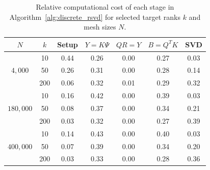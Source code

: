\begin{table}[ht]
\centering
    \begin{tabular}{cc ccccc}
    \toprule
    $N$ & $k$ & Setup & $Y=K\Psi$ & $QR=Y$ & $B=Q^T K$ & SVD \\
    \midrule
    \multirow{3}{*}{$4{,}000$}
    & 10  & 0.44 & 0.26 & 0.00 & 0.27 & 0.03 \\
    & 50  & 0.26 & 0.31 & 0.00 & 0.28 & 0.14 \\
    & 200 & 0.06 & 0.32 & 0.01 & 0.29 & 0.32 \\
    
    \midrule
    \multirow{3}{*}{$180{,}000$}
    & 10  & 0.16 & 0.42 & 0.00 & 0.39 & 0.03 \\
    & 50  & 0.08 & 0.37 & 0.00 & 0.34 & 0.21 \\
    & 200 & 0.03 & 0.32 & 0.00 & 0.27 & 0.39 \\

    \midrule
    \multirow{3}{*}{$400{,}000$}
    & 10  & 0.14 & 0.43 & 0.00 & 0.40 & 0.03 \\
    & 50  & 0.07 & 0.39 & 0.00 & 0.34 & 0.20 \\
    & 200 & 0.03 & 0.33 & 0.00 & 0.28 & 0.36 \\
    \bottomrule
    \end{tabular}
\caption{Relative computational cost of each stage in Algorithm~\ref{alg:discrete_rsvd} for selected target ranks $k$ and mesh sizes $N$.}
\label{tab:rsvd_computational_breakdown}
\end{table}